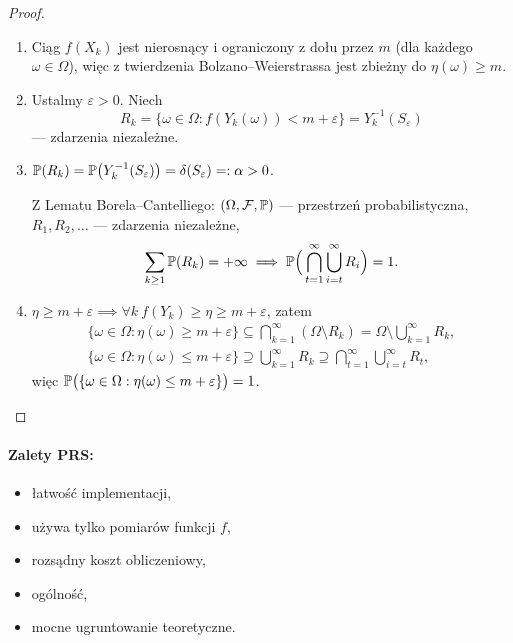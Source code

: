 \documentclass[dvipsnames]{book}
\begin{document}
\begin{proof}
\begin{enumerate}[label=\arabic*)]
  \item Ciąg $f(X_k)$ jest nierosnący i ograniczony z dołu przez $m$ (dla
  każdego $\omega \in \Omega$), więc z twierdzenia Bolzano--Weierstrassa jest
  zbieżny do $\eta(\omega) \geq m$.

  \item Ustalmy $\varepsilon > 0$. Niech
  \[
    R_k = \{\omega \in \Omega : f(Y_k(\omega)) < m + \varepsilon\} = Y_k^{-1}(S_\varepsilon)
  \]
  --- zdarzenia niezależne.

  \item $\P(R_k) = \P\big(Y_k^{-1}(S_\varepsilon)\big) = \delta(S_\varepsilon) =: \alpha > 0$.

  Z Lematu Borela--Cantelliego: $(\Omega, \mathcal{F}, \P)$ --- przestrzeń
  probabilistyczna, $R_1, R_2, \ldots$ --- zdarzenia niezależne,
  \[
    \sum_{k \geq 1} \P(R_k) = +\infty
    \implies
    \P\Big(\bigcap_{t=1}^{\infty} \bigcup_{i=t}^{\infty} R_i\Big) = 1.
  \]

  \item $\eta \geq m + \varepsilon \implies \forall k\ f(Y_k) \geq \eta \geq m + \varepsilon$, zatem
  \begin{gather*}
    \{\omega \in \Omega : \eta(\omega) \geq m + \varepsilon\}
      \subseteq \bigcap_{k=1}^{\infty} (\Omega \setminus R_k)
      = \Omega \setminus \bigcup_{k=1}^{\infty} R_k, \\
    \{\omega \in \Omega : \eta(\omega) \leq m + \varepsilon\}
      \supseteq \bigcup_{k=1}^{\infty} R_k
      \supseteq \bigcap_{t=1}^{\infty} \bigcup_{i=t}^{\infty} R_t,
  \end{gather*}
  więc $\P\big(\{\omega \in \Omega : \eta(\omega) \leq m + \varepsilon\}\big) = 1$.
\end{enumerate}
\end{proof}

\paragraph{Zalety PRS:}
\begin{itemize}[topsep=0pt,itemsep=0pt]
  \item łatwość implementacji,
  \item używa tylko pomiarów funkcji $f$,
  \item rozsądny koszt obliczeniowy,
  \item ogólność,
  \item mocne ugruntowanie teoretyczne.
\end{itemize}
\end{document}
